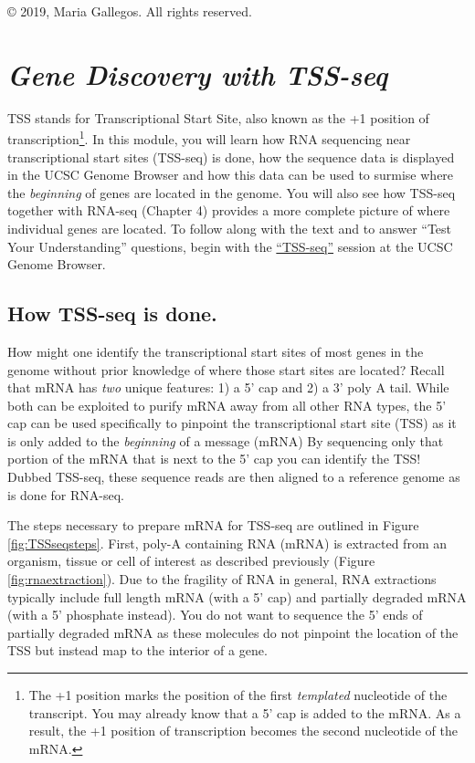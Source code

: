 \documentclass[
]{book}
\begin{document}
© 2019, Maria Gallegos. All rights reserved.

\hypertarget{gene-discovery-with-tss-seq}{%
\chapter{\texorpdfstring{\emph{Gene Discovery with TSS-seq}}{Gene Discovery with TSS-seq}}\label{gene-discovery-with-tss-seq}}

TSS stands for Transcriptional Start Site, also known as the +1 position of transcription\footnote{The +1 position marks the position of the first \emph{templated} nucleotide of the transcript. You may already know that a 5' cap is added to the mRNA. As a result, the +1 position of transcription becomes the second nucleotide of the mRNA.}. In this module, you will learn how RNA sequencing near transcriptional start sites (TSS-seq) is done, how the sequence data is displayed in the UCSC Genome Browser and how this data can be used to surmise where the \emph{beginning} of genes are located in the genome. You will also see how TSS-seq together with RNA-seq (Chapter 4) provides a more complete picture of where individual genes are located. To follow along with the text and to answer ``Test Your Understanding'' questions, begin with the \href{https://genome.ucsc.edu/s/megallegos/Biol\%20310\%3A\%20Module\%202\%20TSS\%2Dseq}{``TSS-seq''} session at the UCSC Genome Browser.

\hypertarget{how-tss-seq-is-done.}{%
\section{How TSS-seq is done.}\label{how-tss-seq-is-done.}}

How might one identify the transcriptional start sites of most genes in the genome without prior knowledge of where those start sites are located? Recall that mRNA has \emph{two} unique features: 1) a 5' cap and 2) a 3' poly A tail. While both can be exploited to purify mRNA away from all other RNA types, the 5' cap can be used specifically to pinpoint the transcriptional start site (TSS) as it is only added to the \emph{beginning} of a message (mRNA) By sequencing only that portion of the mRNA that is next to the 5' cap you can identify the TSS! Dubbed TSS-seq, these sequence reads are then aligned to a reference genome as is done for RNA-seq.

The steps necessary to prepare mRNA for TSS-seq are outlined in Figure \ref{fig:TSSseqsteps}. First, poly-A containing RNA (mRNA) is extracted from an organism, tissue or cell of interest as described previously (Figure \ref{fig:rnaextraction}). Due to the fragility of RNA in general, RNA extractions typically include full length mRNA (with a 5' cap) and partially degraded mRNA (with a 5' phosphate instead). You do not want to sequence the 5' ends of partially degraded mRNA as these molecules do not pinpoint the location of the TSS but instead map to the interior of a gene.
\end{document}
